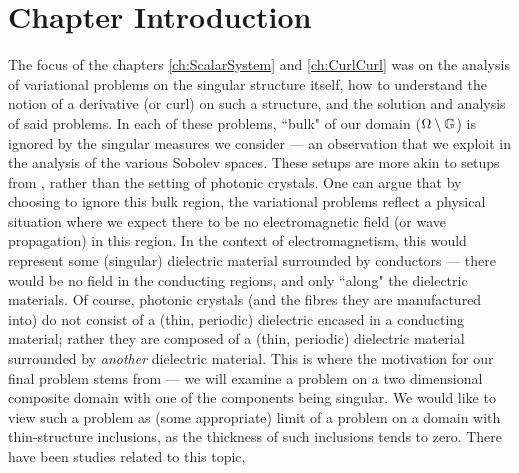 \section{Chapter Introduction} \label{sec:SingIncChapterIntro}
The focus of the chapters \ref{ch:ScalarSystem} and \ref{ch:CurlCurl} was on the analysis of variational problems on the singular structure itself, how to understand the notion of a derivative (or curl) on such a structure, and the solution and analysis of said problems.
In each of these problems, ``bulk" of our domain ($\Omega\setminus\mathbb{G}$) is ignored by the singular measures we consider --- an observation that we exploit in the analysis of the various Sobolev spaces.
These setups are more akin to setups from , rather than the setting of photonic crystals.
One can argue that by choosing to ignore this bulk region, the variational problems reflect a physical situation where we expect there to be no electromagnetic field (or wave propagation) in this region.
In the context of electromagnetism, this would represent some (singular) dielectric material surrounded by conductors --- there would be no field in the conducting regions, and only ``along" the dielectric materials.
Of course, photonic crystals (and the fibres they are manufactured into) do not consist of a (thin, periodic) dielectric encased in a conducting material; rather they are composed of a (thin, periodic) dielectric material surrounded by \emph{another} dielectric material.
This is where the motivation for our final problem stems from --- we will examine a problem on a two dimensional composite domain with one of the components being singular.
We would like to view such a problem as (some appropriate) limit of a problem on a domain with thin-structure inclusions, as the thickness of such inclusions tends to zero.
There have been studies related to this topic, 

